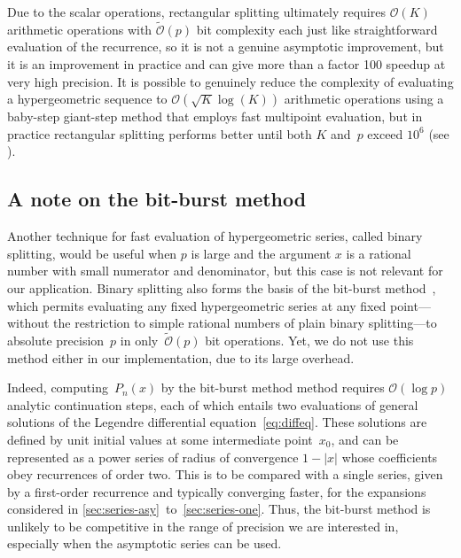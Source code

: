 \documentclass[nohypdvips,review]{siamart0216}
\newcommand{\OO}{\mathcal{O}}
\newcommand{\OOtilde}{\widetilde{\mathcal{O}}}
\begin{document}
Due to the scalar operations, rectangular splitting ultimately
requires $\OO(K)$ arithmetic operations with $\OOtilde(p)$ bit complexity
each
just like straightforward evaluation of the recurrence, so it is
not a genuine asymptotic improvement, but
it is an improvement in practice and
can give more than a factor 100 speedup at very high precision.
It is possible to genuinely reduce the complexity of evaluating
a hypergeometric sequence to $\OO(\sqrt{K} \log(K))$ arithmetic
operations using a baby-step giant-step method
that employs fast multipoint evaluation,
but in practice rectangular splitting
performs better until both $K$ and~$p$
exceed $10^6$ (see \cite{Johansson2014rectangular}).

\subsection{A note on the bit-burst method}

Another technique for fast evaluation of hypergeometric series,
called binary splitting, would be useful when $p$ is large and the
argument $x$ is a rational number with small numerator and denominator,
but this case is not relevant for our application.
Binary splitting also forms the basis of the bit-burst
method~\cite[Section 4]{ChudnovskyChudnovsky1990}, which permits
evaluating any fixed hypergeometric series at any fixed point---without
the restriction to simple rational numbers of plain binary
splitting---to absolute precision~$p$ in only~$\OOtilde(p)$ bit
operations.
Yet, we do not use this method either in our implementation, due to its
large overhead.

Indeed, computing~$P_n(x)$ by the bit-burst method method requires
$\OO(\log p)$ analytic continuation steps, each of which entails
two evaluations of general solutions of the Legendre differential
equation~\cref{eq:diffeq}.
These solutions are defined by unit initial values at some intermediate
point~$x_0$, and can be represented as a power series of radius of
convergence $1 - |x|$ whose coefficients obey recurrences of order two.
This is to be compared with a single series, given by a first-order
recurrence and typically converging faster, for the expansions
considered in \cref{sec:series-asy}~to~\cref{sec:series-one}.
Thus, the bit-burst method is unlikely to be competitive in the range
of precision we are interested in, especially when the asymptotic
series can be used.
\end{document}
